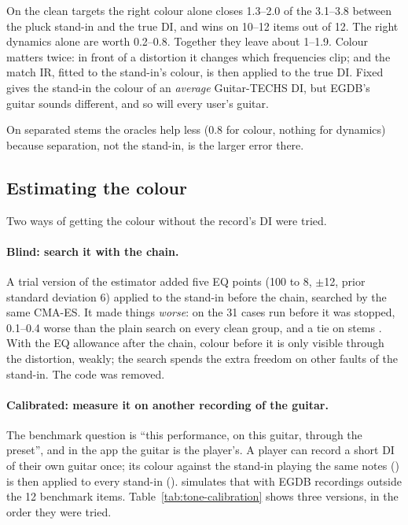\begin{keyidea}
On the clean targets the right colour alone closes 1.3--2.0\dB{} of the
3.1--3.8\dB{} between the pluck stand-in and the true DI, and wins on 10--12
items out of 12. The right dynamics alone are worth 0.2--0.8\dB. Together they
leave about 1--1.9\dB. Colour matters twice: in front of a distortion it changes
which frequencies clip; and the match IR, fitted to the stand-in's colour, is
then applied to the true DI. Fixed  gives the stand-in the colour of
an \emph{average} Guitar-TECHS DI, but EGDB's guitar sounds different, and so
will every user's guitar.
\end{keyidea}

On separated stems the oracles help less (0.8\dB{} for colour, nothing for
dynamics) because separation, not the stand-in, is the larger error there.

\subsection{Estimating the colour}
\label{sec:results-colour}

Two ways of getting the colour without the record's DI were tried.

\paragraph{Blind: search it with the chain.} A trial version of the estimator
added five EQ points (100\Hz{} to 8\kHz, $\pm$12\dB, prior standard deviation
6\dB) applied to the stand-in before the chain, searched by the same CMA-ES. It made things \emph{worse}: on the 31 cases run before it
was stopped, 0.1--0.4\dB{} worse than the plain search on every clean group, and
a tie on stems \measured. With the EQ allowance after the chain, colour before
it is only visible through the distortion, weakly; the search spends the extra
freedom on other faults of the stand-in. The code was removed.

\paragraph{Calibrated: measure it on another recording of the guitar.} The
benchmark question is ``this performance, on this guitar, through the preset'',
and in the app the guitar is the player's. A player can record a short DI of
their own guitar once; its colour against the stand-in playing the same notes
() is then applied to every stand-in
().  simulates that with
EGDB recordings outside the 12 benchmark items.
Table~\ref{tab:tone-calibration} shows three versions, in the order they were
tried.

